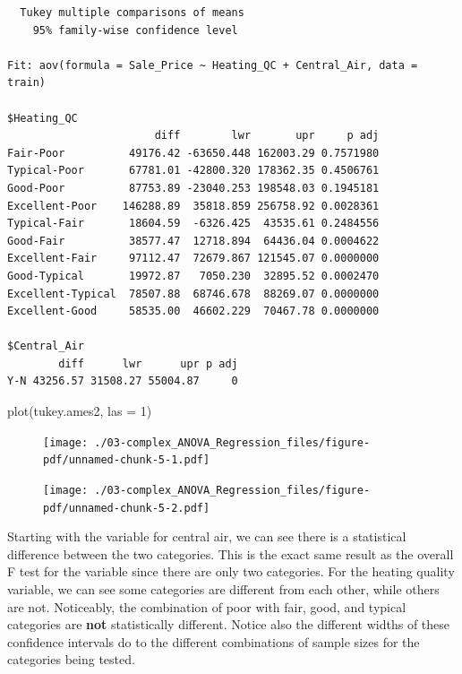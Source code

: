\documentclass[
  letterpaper,
  DIV=11,
  numbers=noendperiod]{scrreprt}
\newenvironment{Shaded}{\begin{snugshade}}{\end{snugshade}}
\newcommand{\AttributeTok}[1]{\textcolor[rgb]{0.40,0.45,0.13}{#1}}
\newcommand{\DecValTok}[1]{\textcolor[rgb]{0.68,0.00,0.00}{#1}}
\newcommand{\FunctionTok}[1]{\textcolor[rgb]{0.28,0.35,0.67}{#1}}
\newcommand{\NormalTok}[1]{\textcolor[rgb]{0.00,0.23,0.31}{#1}}
\begin{document}
\begin{verbatim}
  Tukey multiple comparisons of means
    95% family-wise confidence level

Fit: aov(formula = Sale_Price ~ Heating_QC + Central_Air, data = train)

$Heating_QC
                       diff        lwr       upr     p adj
Fair-Poor          49176.42 -63650.448 162003.29 0.7571980
Typical-Poor       67781.01 -42800.320 178362.35 0.4506761
Good-Poor          87753.89 -23040.253 198548.03 0.1945181
Excellent-Poor    146288.89  35818.859 256758.92 0.0028361
Typical-Fair       18604.59  -6326.425  43535.61 0.2484556
Good-Fair          38577.47  12718.894  64436.04 0.0004622
Excellent-Fair     97112.47  72679.867 121545.07 0.0000000
Good-Typical       19972.87   7050.230  32895.52 0.0002470
Excellent-Typical  78507.88  68746.678  88269.07 0.0000000
Excellent-Good     58535.00  46602.229  70467.78 0.0000000

$Central_Air
        diff      lwr      upr p adj
Y-N 43256.57 31508.27 55004.87     0
\end{verbatim}

\begin{Shaded}
\begin{Highlighting}[]
\FunctionTok{plot}\NormalTok{(tukey.ames2, }\AttributeTok{las =} \DecValTok{1}\NormalTok{)}
\end{Highlighting}
\end{Shaded}

\begin{figure}[H]

{\centering \texttt{[image: ./03-complex\_ANOVA\_Regression\_files/figure-pdf/unnamed-chunk-5-1.pdf]}

}

\end{figure}

\begin{figure}[H]

{\centering \texttt{[image: ./03-complex\_ANOVA\_Regression\_files/figure-pdf/unnamed-chunk-5-2.pdf]}

}

\end{figure}

Starting with the variable for central air, we can see there is a
statistical difference between the two categories. This is the exact
same result as the overall F test for the variable since there are only
two categories. For the heating quality variable, we can see some
categories are different from each other, while others are not.
Noticeably, the combination of poor with fair, good, and typical
categories are \textbf{not} statistically different. Notice also the
different widths of these confidence intervals do to the different
combinations of sample sizes for the categories being tested.
\end{document}
